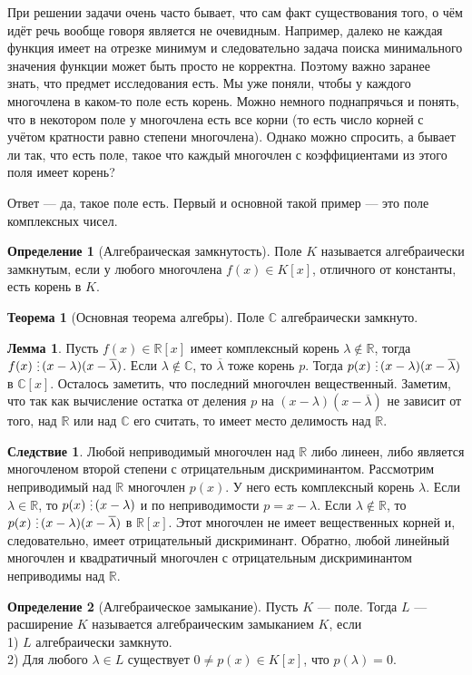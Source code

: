 \documentclass[10pt,a4paper,oneside]{book} %
\theoremstyle{definition}
\newtheorem*{defn}{Определение}
\newtheorem{thm}{Теорема}
\newtheorem{lem}{Лемма}
\newtheorem{cor}{Следствие}
\newcommand{\mb}[1]{\mathbb{#1}}
\newcommand{\ovl}{\overline}
\newcommand{\di}{\mathop{\,\scalebox{0.85}{\raisebox{-1.2pt}[0.5\height]{\vdots}}\,}}
\def\thrm{\begin{thm}}
\def\ethrm{\end{thm}}
\def\dfn{\begin{defn}}
\def\edfn{\end{defn}}
\def\lm{\begin{lem}}
\def\elm{\end{lem}}
\def\crl{\begin{cor}}
\def\ecrl{\end{cor}}
\begin{document}
При решении задачи очень часто бывает, что сам факт существования того, о чём идёт речь вообще говоря является не очевидным. Например, далеко не каждая функция имеет на отрезке минимум и следовательно задача поиска минимального значения функции может быть просто не корректна. Поэтому важно заранее знать, что предмет исследования есть. Мы уже поняли, чтобы у каждого многочлена в каком-то поле есть корень. Можно немного поднапрячься и понять, что в некотором поле у многочлена есть все корни (то есть число корней с учётом кратности равно степени многочлена). Однако можно спросить, а бывает ли так, что есть поле, такое что каждый многочлен с коэффициентами из этого поля имеет корень?

Ответ — да, такое поле есть. Первый и основной такой пример --- это поле комплексных чисел.
\dfn[Алгебраическая замкнутость] Поле $K$ называется алгебраически замкнутым, если у любого многочлена  $f(x)\in K[x]$, отличного от константы, есть корень в $K$.
\edfn

\thrm[Основная теорема алгебры] Поле $\mb C$ алгебраически замкнуто.
\ethrm

\lm Пусть $f(x)\in \mb R[x]$ имеет комплексный корень $\lambda \notin \mb R$, тогда $f(x)\di(x-\lambda)(x-\ovl{\lambda})$.
\proof Если $\lambda \notin \mb C$, то $\ovl{\lambda}$ тоже корень $p$. Тогда $p(x)\di(x-\lambda)(x-\ovl{\lambda})$ в $\mb C[x]$. Осталось заметить, что последний многочлен вещественный. Заметим, что так как вычисление остатка от деления $p$ на $(x-\lambda)(x-\ovl{\lambda})$ не зависит от того, над $\mb R$ или над $\mb C$ его считать, то имеет место делимость над $\mb R$.
\endproof
\elm

\crl Любой неприводимый многочлен над $\mb R$ либо линеен, либо является многочленом второй степени с отрицательным дискриминантом.
\proof Рассмотрим неприводимый над $\mb R$ многочлен $p(x)$. У него есть комплексный корень $\lambda$. Если $\lambda \in \mb R$, то $p(x)\di (x-\lambda)$ и по неприводимости $p=x-\lambda$.  Если $\lambda \notin \mb R$, то $p(x)\di (x-\lambda)(x-\ovl{\lambda})$ в $\mb R[x]$. Этот многочлен не имеет вещественных корней и, следовательно, имеет отрицательный дискриминант. Обратно, любой линейный многочлен и квадратичный многочлен с отрицательным дискриминантом неприводимы над $\mb R$.
\endproof
\ecrl

\dfn[Алгебраическое замыкание] Пусть $K$ --- поле. Тогда $L$ --- расширение $K$ называется алгебраическим замыканием $K$, если \\
1) $L$ алгебраически замкнуто.\\
2) Для любого $ \lambda \in L$ существует $0\neq p(x)\in K[x]$, что $p(\lambda)=0$.
\edfn
\end{document}

